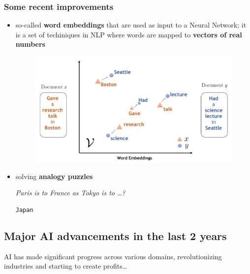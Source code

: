 \subsubsection{Some recent improvements}
\begin{itemize}
    \item so-called \textbf{word embeddings} that are used as input to a Neural Network; it is 
    a set of techiniques in NLP where words are mapped to \textbf{vectors of real numbers}

    \begin{figure}[H]
        \centering
        \includegraphics[width=0.6\linewidth]{01/images/word-embeddings.png}
    \end{figure}
    \item solving \textbf{analogy puzzles}
    
    \textit{Paris is to France as Tokyo is to \dots?}

    \texttt{Japan}
\end{itemize}

\subsection{Major AI advancements in the last 2 years}
AI has made significant progress across various domains, revolutionizing 
industries and starting to create profits\dots










